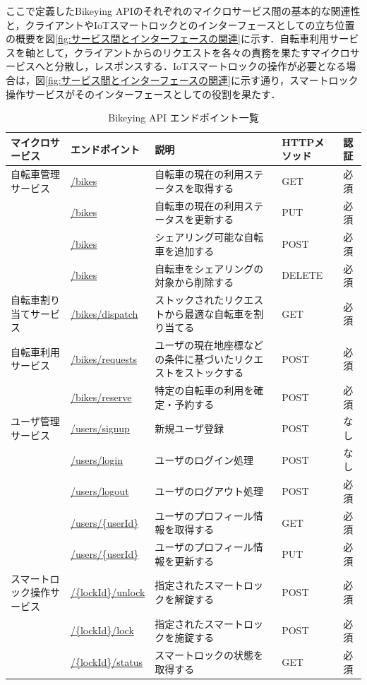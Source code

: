           \par ここで定義したBikeying APIのそれぞれのマイクロサービス間の基本的な関連性と，クライアントやIoTスマートロックとのインターフェースとしての立ち位置の概要を図\ref{fig:サービス間とインターフェースの関連}に示す．自転車利用サービスを軸として，クライアントからのリクエストを各々の責務を果たすマイクロサービスへと分散し，レスポンスする．IoTスマートロックの操作が必要となる場合は，図\ref{fig:サービス間とインターフェースの関連}に示す通り，スマートロック操作サービスがそのインターフェースとしての役割を果たす．

          \begin{table}[t]
            \caption{Bikeying API エンドポイント一覧}
            \label{tab:Bikeying API エンドポイント一覧}
            \centering
            \begin{tabular}{|p{3.5cm}|l|p{5cm}|l|l|} \hline
              マイクロサービス & エンドポイント & 説明 & HTTPメソッド & 認証 \\ \hline
              自転車管理サービス & \url{/bikes} & 自転車の現在の利用ステータスを取得する & GET & 必須 \\ \cline{2-5}
              & \url{/bikes} & 自転車の現在の利用ステータスを更新する & PUT & 必須 \\ \cline{2-5}
              & \url{/bikes} & シェアリング可能な自転車を追加する & POST & 必須 \\ \cline{2-5}
              & \url{/bikes} & 自転車をシェアリングの対象から削除する & DELETE & 必須 \\ \hline
              自転車割り当てサービス & \url{/bikes/dispatch} & ストックされたリクエストから最適な自転車を割り当てる & GET & 必須 \\ \hline
              自転車利用サービス & \url{/bikes/requests} & ユーザの現在地座標などの条件に基づいたリクエストをストックする & POST & 必須 \\ \cline{2-5}
              & \url{/bikes/reserve} & 特定の自転車の利用を確定・予約する & POST & 必須 \\ \hline
              ユーザ管理サービス & \url{/users/signup} & 新規ユーザ登録 & POST & なし \\ \cline{2-5}
              & \url{/users/login} & ユーザのログイン処理 & POST & なし \\ \cline{2-5}
              & \url{/users/logout} & ユーザのログアウト処理 & POST & 必須 \\ \cline{2-5}
              & \url{/users/{userId}} & ユーザのプロフィール情報を取得する & GET & 必須 \\ \cline{2-5}
              & \url{/users/{userId}} & ユーザのプロフィール情報を更新する & PUT & 必須 \\ \hline
              スマートロック操作サービス & \url{/{lockId}/unlock} & 指定されたスマートロックを解錠する & POST & 必須 \\ \cline{2-5}
              & \url{/{lockId}/lock} & 指定されたスマートロックを施錠する & POST & 必須 \\ \cline{2-5}
              & \url{/{lockId}/status} & スマートロックの状態を取得する & GET & 必須 \\ \hline
            \end{tabular}
          \end{table}

